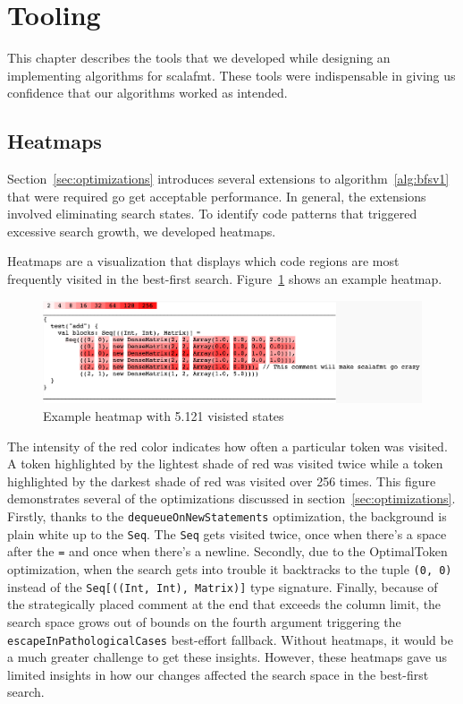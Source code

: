 \section{Tooling}\label{sec:tooling}
This chapter describes the tools that we developed while designing an implementing algorithms for scalafmt.
These tools were indispensable in giving us confidence that our algorithms worked as intended.

\subsection{Heatmaps}
Section~\ref{sec:optimizations} introduces several extensions to algorithm~\ref{alg:bfsv1} that were required go get acceptable performance.
In general, the extensions involved eliminating search states.
To identify code patterns that triggered excessive search growth, we developed heatmaps.

Heatmaps are a visualization that displays which code regions are most frequently visited in the best-first search.
Figure~\ref{fig:heatmap} shows an example heatmap.
\begin{figure}
  \centering
  \includegraphics[width=\textwidth]{img/heatmap.png}
  \caption{Example heatmap with 5.121 visisted states}
  \label{fig:heatmap}
\end{figure}
The intensity of the red color indicates how often a particular token was visited.
A token highlighted by the lightest shade of red was visited twice while a token highlighted by the darkest shade of red was visited over 256 times.
This figure demonstrates several of the optimizations discussed in section~\ref{sec:optimizations}.
Firstly, thanks to the \texttt{dequeueOnNewStatements} optimization, the background is plain white up to the \texttt{Seq}.
The \texttt{Seq} gets visited twice, once when there's a space after the \texttt{=} and once when there's a newline.
Secondly, due to the OptimalToken optimization, when the search gets into trouble it backtracks to the tuple \texttt{(0, 0)} instead of the \texttt{Seq[((Int, Int), Matrix)]} type signature.
Finally, because of the strategically placed comment at the end that exceeds the column limit, the search space grows out of bounds on the fourth argument triggering the \texttt{escapeInPathologicalCases} best-effort fallback.
Without heatmaps, it would be a much greater challenge to get these insights.
However, these heatmaps gave us limited insights in how our changes affected the search space in the best-first search.


